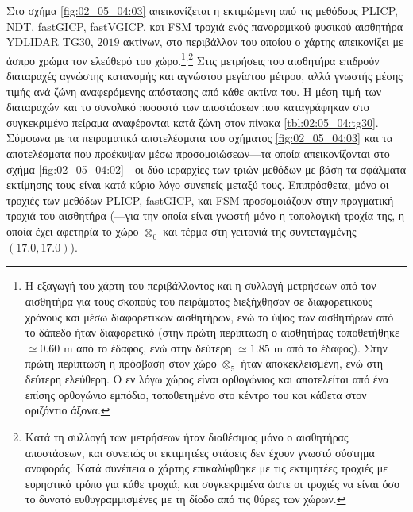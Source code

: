 Στο σχήμα \ref{fig:02_05_04:03} απεικονίζεται η εκτιμώμενη από τις μεθόδους
PLICP, NDT, fastGICP, fastVGICP, και FSM τροχιά ενός πανοραμικού φυσικού
αισθητήρα YDLIDAR TG30, $2019$ ακτίνων, στο περιβάλλον του οποίου ο χάρτης
απεικονίζει με άσπρο χρώμα τον ελεύθερό του χώρο.\footnote{Η εξαγωγή του χάρτη
του περιβάλλοντος και η συλλογή μετρήσεων από τον αισθητήρα για τους σκοπούς
του πειράματος διεξήχθησαν σε διαφορετικούς χρόνους και μέσω διαφορετικών
αισθητήρων, ενώ το ύψος των αισθητήρων από το δάπεδο ήταν διαφορετικό (στην
πρώτη περίπτωση ο αισθητήρας τοποθετήθηκε $\simeq 0.60$ m από το έδαφος, ενώ
στην δεύτερη $\simeq 1.85$ m από το έδαφος). Στην πρώτη περίπτωση η πρόσβαση
στον χώρο $\otimes_5$ ήταν αποκεκλεισμένη, ενώ στη δεύτερη ελεύθερη.  Ο εν λόγω
χώρος είναι ορθογώνιος και αποτελείται από ένα επίσης ορθογώνιο εμπόδιο,
τοποθετημένο στο κέντρο του και κάθετα στον οριζόντιο
άξονα.}\textsuperscript{,}\footnote{Κατά τη συλλογή των μετρήσεων ήταν
διαθέσιμος μόνο ο αισθητήρας αποστάσεων, και συνεπώς οι εκτιμητέες στάσεις δεν
έχουν γνωστό σύστημα αναφοράς. Κατά συνέπεια ο χάρτης επικαλύφθηκε με τις
εκτιμητέες τροχιές με ευρηστικό τρόπο για κάθε τροχιά, και συγκεκριμένα ώστε οι
τροχιές να είναι όσο το δυνατό ευθυγραμμισμένες με τη δίοδο από τις θύρες των
χώρων.} Στις μετρήσεις του αισθητήρα επιδρούν διαταραχές αγνώστης κατανομής και
αγνώστου μεγίστου μέτρου, αλλά γνωστής μέσης τιμής ανά ζώνη αναφερόμενης
απόστασης από κάθε ακτίνα του. Η μέση τιμή των διαταραχών και το συνολικό
ποσοστό των αποστάσεων που καταγράφηκαν στο συγκεκριμένο πείραμα αναφέρονται
κατά ζώνη στον πίνακα \ref{tbl:02:05_04:tg30}.  Σύμφωνα με τα πειραματικά
αποτελέσματα του σχήματος \ref{fig:02_05_04:03} και τα αποτελέσματα που
προέκυψαν μέσω προσομοιώσεων---τα οποία απεικονίζονται στο σχήμα
\ref{fig:02_05_04:02}---οι δύο ιεραρχίες των τριών μεθόδων με βάση τα σφάλματα
εκτίμησης τους είναι κατά κύριο λόγο συνεπείς μεταξύ τους.  Επιπρόσθετα, μόνο
οι τροχιές των μεθόδων PLICP, fastGICP, και FSM προσομοιάζουν στην πραγματική
τροχιά του αισθητήρα (---για την οποία είναι γνωστή μόνο η τοπολογική τροχία
της, η οποία έχει αφετηρία το χώρο $\otimes_0$ και τέρμα στη γειτονιά της
συντεταγμένης $(17.0, 17.0)$).


